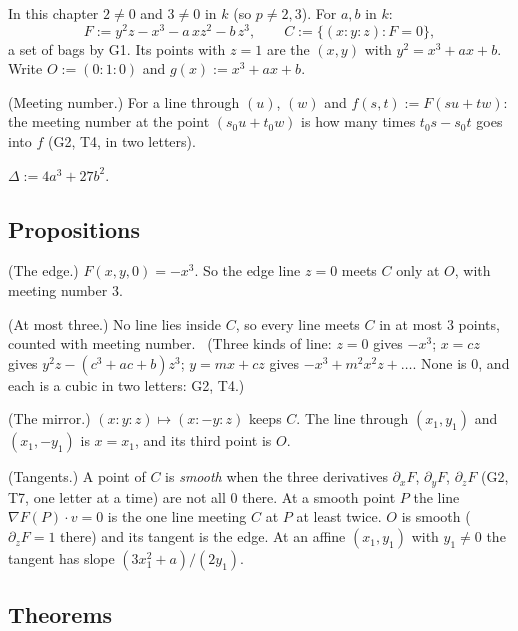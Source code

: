 \begin{lines}
\item[\lab{D1}] In this chapter $2 \ne 0$ and $3 \ne 0$ in $k$ (so $p \ne 2, 3$). For $a, b$ in $k$: \[ F := y^2 z - x^3 - a\,x z^2 - b\,z^3, \qquad C := \{ (x : y : z) : F = 0 \}, \] a set of bags by G1. Its points with $z = 1$ are the $(x, y)$ with $y^2 = x^3 + ax + b$. Write $O := (0 : 1 : 0)$ and $g(x) := x^3 + ax + b$.
\item[\lab{D2}] (Meeting number.) For a line through $(u)$, $(w)$ and $f(s, t) := F(su + tw)$: the meeting number at the point $(s_0 u + t_0 w)$ is how many times $t_0 s - s_0 t$ goes into $f$ (G2, T4, in two letters).
\item[\lab{D3}] $\Delta := 4a^3 + 27b^2$.
\end{lines}

\subsection*{Propositions}

\begin{lines}
\item[\lab{P1}] (The edge.) $F(x, y, 0) = -x^3$. So the edge line $z = 0$ meets $C$ only at $O$, with meeting number $3$.
\item[\lab{P2}] (At most three.) No line lies inside $C$, so every line meets $C$ in at most $3$ points, counted with meeting number. \ (Three kinds of line: $z = 0$ gives $-x^3$; $x = cz$ gives $y^2 z - (c^3 + ac + b) z^3$; $y = mx + cz$ gives $-x^3 + m^2 x^2 z + \dots$. None is $0$, and each is a cubic in two letters: G2, T4.)
\item[\lab{P3}] (The mirror.) $(x : y : z) \mapsto (x : -y : z)$ keeps $C$. The line through $(x_1, y_1)$ and $(x_1, -y_1)$ is $x = x_1$, and its third point is $O$.
\item[\lab{P4}] (Tangents.) A point of $C$ is \emph{smooth} when the three derivatives $\partial_x F$, $\partial_y F$, $\partial_z F$ (G2, T7, one letter at a time) are not all $0$ there. At a smooth point $P$ the line $\nabla F(P) \cdot v = 0$ is the one line meeting $C$ at $P$ at least twice. $O$ is smooth ($\partial_z F = 1$ there) and its tangent is the edge. At an affine $(x_1, y_1)$ with $y_1 \ne 0$ the tangent has slope $(3x_1^2 + a)/(2y_1)$.
\end{lines}

\subsection*{Theorems}

